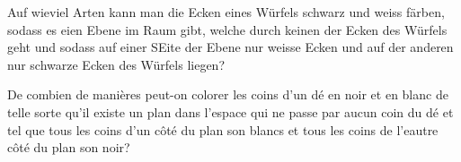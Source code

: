 Auf wieviel Arten kann man die Ecken eines Würfels schwarz und weiss färben, sodass es eien Ebene im Raum gibt, welche durch keinen der Ecken des Würfels geht und sodass auf einer SEite der Ebene nur weisse Ecken und auf der anderen nur schwarze Ecken des Würfels liegen?

\bigskip

De combien de manières peut-on colorer les coins d'un dé en noir et en blanc de telle sorte qu'il existe un plan dans l'espace qui ne passe par aucun coin du dé et tel que tous les coins d'un côté du plan son blancs et tous les coins de l'eautre côté du plan son noir?